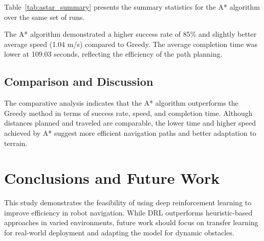\documentclass[conference]{IEEEtran}
\begin{document}
Table~\ref{tab:astar_summary} presents the summary statistics for the A* algorithm over the same set of runs.

\begin{table}[ht]
\centering
\caption{Summary statistics for the A* algorithm (100 runs).}
\label{tab:astar_summary}
\end{table}

The A* algorithm demonstrated a higher success rate of 85\% and slightly better average speed (1.04 m/s) compared to Greedy. The average completion time was lower at 109.03 seconds, reflecting the efficiency of the path planning.

\subsection{Comparison and Discussion}

The comparative analysis indicates that the A* algorithm outperforms the Greedy method in terms of success rate, speed, and completion time. Although distances planned and traveled are comparable, the lower time and higher speed achieved by A* suggest more efficient navigation paths and better adaptation to terrain.


\section{Conclusions and Future Work}

This study demonstrates the feasibility of using deep reinforcement learning to improve efficiency in robot navigation. While DRL outperforms heuristic-based approaches in varied environments, future work should focus on transfer learning for real-world deployment and adapting the model for dynamic obstacles.



\end{document}
